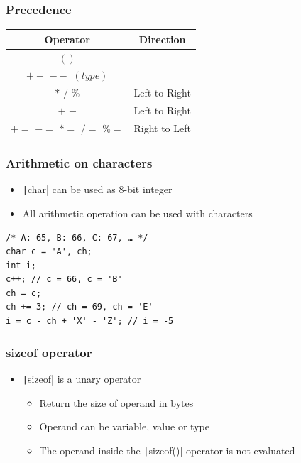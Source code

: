 \documentclass{../c-lecture}
\begin{document}
\begin{frame}
  \frametitle{Precedence}
  \begin{table}
  \begin{tabular}{cc}
    \toprule

    Operator &
    Direction \\

    \midrule

    $( )$&
    \\

    \midrule

    $++$ $--$ $(type)$ &
    \\

    \midrule

    $*$ $/$ $\%$ &
    Left to Right \\

    \midrule

    $+$ $-$ &
    Left to Right \\

    \midrule

    $+=$ $-=$ $*=$ $/=$ $\%=$ &
    Right to Left \\

    \bottomrule
  \end{tabular}
  \end{table}
\end{frame}

\begin{frame}[fragile]
  \frametitle{Arithmetic on characters}
  \begin{itemize}
    \item \texttt|char| can be used as 8-bit integer
    \item All arithmetic operation can be used with characters
  \end{itemize}
  \begin{verbatim}
/* A: 65, B: 66, C: 67, … */
char c = 'A', ch;
int i;
c++; // c = 66, c = 'B'
ch = c;
ch += 3; // ch = 69, ch = 'E'
i = c - ch + 'X' - 'Z'; // i = -5
  \end{verbatim}
\end{frame}

\begin{frame}
  \frametitle{sizeof operator}
  \begin{itemize}
    \item \texttt|sizeof| is a unary operator
    \begin{itemize}
      \item Return the size of operand in bytes
      \item Operand can be {\color{Cyan} variable, value or type}
      \item The operand inside the \texttt|sizeof()| operator is not evaluated
    \end{itemize}
  \end{itemize}
\end{frame}
\end{document}
